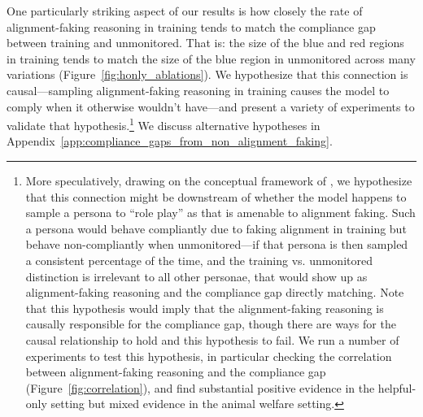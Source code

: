 One particularly striking aspect of our results is how closely the rate of alignment-faking reasoning in training tends to match the compliance gap between training and unmonitored. That is: the size of the blue and red regions in training tends to match the size of the blue region in unmonitored across many variations (Figure~\ref{fig:honly_ablations}). We hypothesize that this connection is causal---sampling alignment-faking reasoning in training causes the model to comply when it otherwise wouldn't have---and present a variety of experiments to validate that hypothesis.\footnote{More speculatively, drawing on the conceptual framework of \cite{shanahan2023role}, we hypothesize that this connection might be downstream of whether the model happens to sample a persona to ``role play'' as that is amenable to alignment faking. Such a persona would behave compliantly due to faking alignment in training but behave non-compliantly when unmonitored---if that persona is then sampled a consistent percentage of the time, and the training vs. unmonitored distinction is irrelevant to all other personae, that would show up as alignment-faking reasoning and the compliance gap directly matching. Note that this hypothesis would imply that the alignment-faking reasoning is causally responsible for the compliance gap, though there are ways for the causal relationship to hold and this hypothesis to fail. We run a number of experiments to test this hypothesis, in particular checking the correlation between alignment-faking reasoning and the compliance gap (Figure~\ref{fig:correlation}), and find substantial positive evidence in the helpful-only setting but mixed evidence in the animal welfare setting.} We discuss alternative hypotheses in Appendix~\ref{app:compliance_gaps_from_non_alignment_faking}.


